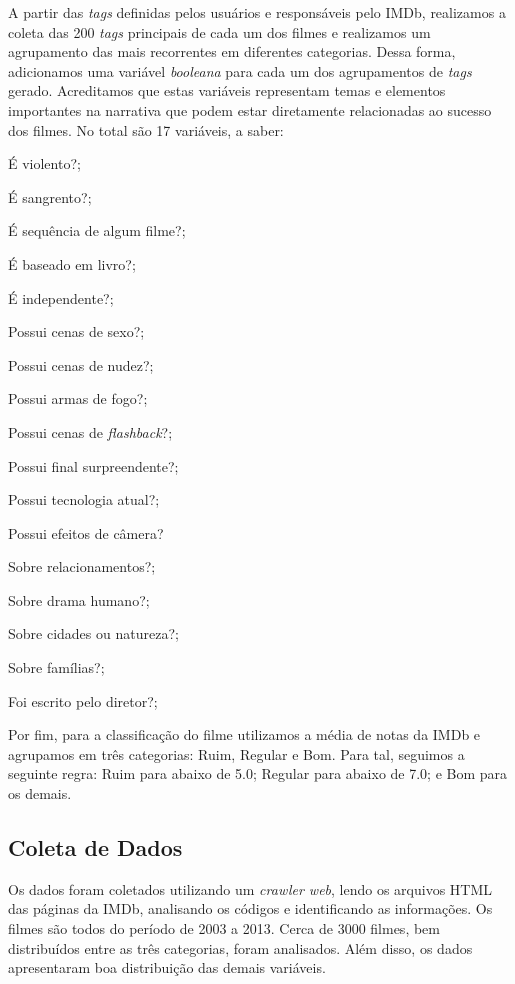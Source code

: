 \documentclass[twoside]{article}
\begin{document}
\begin{multicols}{2}
A partir das \textit{tags} definidas pelos usuários e responsáveis pelo IMDb, realizamos a coleta das 200 \textit{tags} principais de cada um dos filmes e realizamos um agrupamento das mais recorrentes em diferentes categorias. Dessa forma, adicionamos uma variável \textit{booleana} para cada um dos agrupamentos de \textit{tags} gerado. Acreditamos que estas variáveis representam temas e elementos importantes na narrativa que podem estar diretamente relacionadas ao sucesso dos filmes. No total são 17 variáveis, a saber:
\\
\begin{compactitem}
\item É violento?;
\item É sangrento?;
\item É sequência de algum filme?;
\item É baseado em livro?;
\item É independente?;
\item Possui cenas de sexo?;
\item Possui cenas de nudez?;
\item Possui armas de fogo?;
\item Possui cenas de \textit{flashback}?;
\item Possui final surpreendente?;
\item Possui tecnologia atual?;
\item Possui efeitos de câmera?
\item Sobre relacionamentos?;
\item Sobre drama humano?;
\item Sobre cidades ou natureza?;
\item Sobre famílias?;
\item Foi escrito pelo diretor?; \\
\end{compactitem}

Por fim, para a classificação do filme utilizamos a média de notas da IMDb e agrupamos em três categorias: Ruim, Regular e Bom. Para tal, seguimos a seguinte regra: Ruim para abaixo de 5.0; Regular para abaixo de 7.0; e Bom para os demais.

\subsection{Coleta de Dados}
Os dados foram coletados utilizando um \textit{crawler web}, lendo os arquivos HTML das páginas da IMDb, analisando os códigos e identificando as informações. Os filmes são todos do período de 2003 a 2013. Cerca de 3000 filmes, bem distribuídos entre as três categorias, foram analisados. Além disso, os dados apresentaram boa distribuição das demais variáveis.


\end{multicols}
\end{document}
